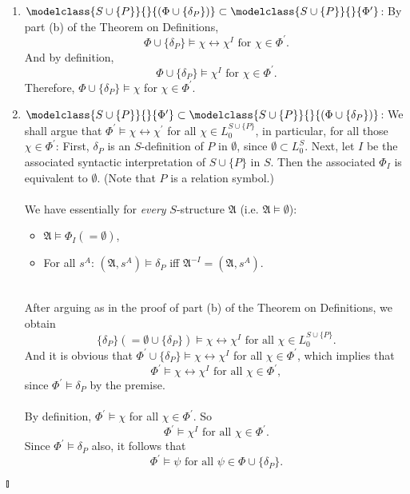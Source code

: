 \begin{enumerate}[1.]
\begin{enumerate}[1)]
\item $\modelclass{S \cup \{ P \}}{}{(\Phi \cup \{ \delta_P \})} \subset \modelclass{S \cup \{ P \}}{}{\Phi^\prime}$: By part (b) of the Theorem on Definitions,
\[
\mbox{$\Phi \cup \{ \delta_P \} \models \chi \leftrightarrow \chi^I$ for $\chi \in \Phi^\prime$}.
\]
And by definition,
\[
\mbox{$\Phi \cup \{ \delta_P \} \models \chi^I$ for $\chi \in \Phi^\prime$}.
\]
Therefore, $\Phi \cup \{ \delta_P \} \models \chi$ for $\chi \in \Phi^\prime$.
\item $\modelclass{S \cup \{ P \}}{}{\Phi^\prime} \subset \modelclass{S \cup \{ P \}}{}{(\Phi \cup \{ \delta_P \})}$: We shall argue that $\Phi^\prime \models \chi \leftrightarrow \chi^\prime$ for all $\chi \in L_0^{S \cup \{ P \}}$, in particular, for all those $\chi \in \Phi^\prime$: First, $\delta_P$ is an $S$-definition of $P$ in $\emptyset$, since $\emptyset \subset L_0^S$. Next, let $I$ be the associated syntactic interpretation of $S \cup \{ P \}$ in $S$. Then the associated $\Phi_I$ is equivalent to $\emptyset$. (Note that $P$ is a relation symbol.)\\
\\
We have essentially for \textit{every} $S$-structure $\mathfrak{A}$ (i.e. $\mathfrak{A} \models \emptyset$):
\begin{itemize}
\item $\mathfrak{A} \models \Phi_I (= \emptyset)$,
\item For all $s^A$: $(\mathfrak{A}, s^A) \models \delta_P$ iff $\mathfrak{A}^{-I} = (\mathfrak{A}, s^A)$.
\end{itemize}
\ 
\\
After arguing as in the proof of part (b) of the Theorem on Definitions, we obtain 
\[
\mbox{$\{ \delta_P \} (= \emptyset \cup \{ \delta_P \}) \models \chi \leftrightarrow \chi^I$ for all $\chi \in L_0^{S \cup \{ P \}}$}.
\]
And it is obvious that $\Phi^\prime \cup \{ \delta_P \} \models \chi \leftrightarrow \chi^I$ for all $\chi \in \Phi^\prime$, which implies that
\[
\mbox{$\Phi^\prime \models \chi \leftrightarrow \chi^I$ for all $\chi \in \Phi^\prime$},
\]
since $\Phi^\prime \models \delta_P$ by the premise.\\
\\
By definition, $\Phi^\prime \models \chi$ for all $\chi \in \Phi^\prime$. So
\[
\mbox{$\Phi^\prime \models \chi^I$ for all $\chi \in \Phi^\prime$}.
\]
Since $\Phi^\prime \models \delta_P$ also, it follows that
\[
\mbox{$\Phi^\prime \models \psi$ for all $\psi \in \Phi \cup \{ \delta_P \}$}.
\]
\end{enumerate} \begin{flushright}$\talloblong$\end{flushright}
\end{enumerate}
